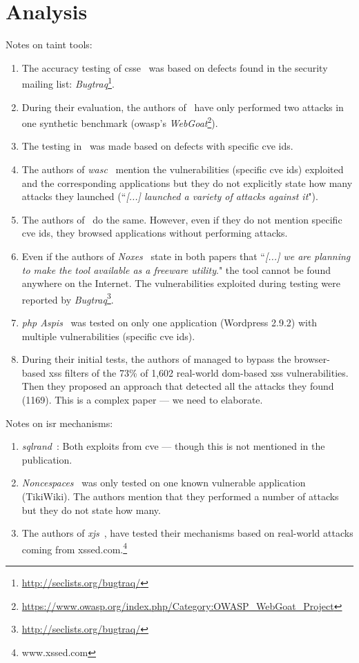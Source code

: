 \documentclass[conference]{IEEEtran}
\begin{document}
\section{Analysis}

Notes on taint tools:
\begin{enumerate}
\item The accuracy testing of {\sc csse}~\cite{PB05} was based on 
defects found in the security mailing
list: {\it Bugtraq}\footnote{\url{http://seclists.org/bugtraq/}}.
\item During their evaluation, the authors of~\cite{HCF05} have only performed
two attacks in one synthetic benchmark ({\sc owasp}'s
{\it WebGoat}\footnote{\url{https://www.owasp.org/index.php/Category:OWASP_WebGoat_Project}}).
\item The testing in~\cite{XBS06} was made based on
defects with specific {\sc cve id}s.
\item The authors of {\it {\sc wasc}}~\cite{NLC07}
mention the vulnerabilities (specific {\sc cve id}s)
exploited and the corresponding applications but they do not explicitly
state how many attacks they launched (``{\it [...] launched a variety of
attacks against it}").
\item The authors of~\cite{VFJKKV07} do the same.
However, even if they do not mention specific {\sc cve id}s,
they browsed applications without performing attacks.
\item Even if the authors of {\it Noxes}~\cite{KKVJ06,KJKV09} state in
both papers that ``{\it [...] we are planning to make the tool available as
a freeware utility}." the tool cannot be found anywhere on the Internet.
The vulnerabilities exploited during testing were reported
by {\it Bugtraq}\footnote{\url{http://seclists.org/bugtraq/}}.
\item {\it {\sc php} Aspis}~\cite{PMP11} was tested on only one
application (Wordpress 2.9.2) with multiple vulnerabilities (specific {\sc cve id}s).
\item During their initial tests, the authors of
managed to bypass the browser-based {\sc xss} filters of the
73\% of 1,602 real-world {\sc dom}-based {\sc xss} vulnerabilities.
Then they proposed an approach that detected all the attacks they
found (1169). This is a complex paper --- we need to elaborate.
\end{enumerate}

Notes on {\sc isr} mechanisms:
\begin{enumerate}
\item {\it {\sc sql}rand}~\cite{BK04}: Both exploits from {\sc cve} --- though
this is not mentioned in the publication.
\item {\it Noncespaces}~\cite{GC09} was only tested on one
known vulnerable application (TikiWiki). The authors mention that they performed
a number of attacks but they do not state how many.
\item The authors of {\it x{\sc js}}~\cite{APKLM10}, have tested
their mechanisms based on real-world attacks coming from
{\sc xss}ed.com.\footnote{www.xssed.com}
\end{enumerate}
\end{document}
